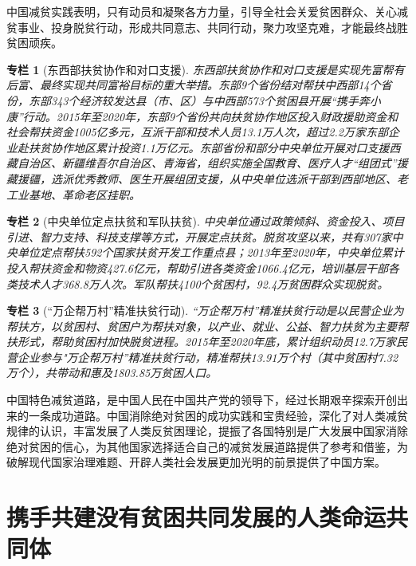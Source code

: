 \documentclass{ctexart}
\newtheorem{zhuanlan}{专栏}
\begin{document}
中国减贫实践表明，只有动员和凝聚各方力量，引导全社会关爱贫困群众、关心减贫事业、投身脱贫行动，形成共同意志、共同行动，聚力攻坚克难，才能最终战胜贫困顽疾。

\begin{zhuanlan}[东西部扶贫协作和对口支援]
    东西部扶贫协作和对口支援是实现先富帮有后富、最终实现共同富裕目标的重大举措。东部9个省份结对帮扶中西部14个省份，东部343个经济较发达县（市、区）与中西部573个贫困县开展“携手奔小康”行动。2015年至2020年，东部9个省份共向扶贫协作地区投入财政援助资金和社会帮扶资金1005亿多元，互派干部和技术人员13.1万人次，超过2.2万家东部企业赴扶贫协作地区累计投资1.1万亿元。东部省份和部分中央单位开展对口支援西藏自治区、新疆维吾尔自治区、青海省，组织实施全国教育、医疗人才“组团式”援藏援疆，选派优秀教师、医生开展组团支援，从中央单位选派干部到西部地区、老工业基地、革命老区挂职。
    \label{col-13}
\end{zhuanlan}

\begin{zhuanlan}[中央单位定点扶贫和军队扶贫]
    中央单位通过政策倾斜、资金投入、项目引进、智力支持、科技支撑等方式，开展定点扶贫。脱贫攻坚以来，共有307家中央单位定点帮扶592个国家扶贫开发工作重点县；2013年至2020年，中央单位累计投入帮扶资金和物资427.6亿元，帮助引进各类资金1066.4亿元，培训基层干部各类技术人才368.8万人次。军队帮扶4100个贫困村，92.4万贫困群众实现脱贫。
    \label{col-14}
\end{zhuanlan}

\begin{zhuanlan}[“万企帮万村”精准扶贫行动]
    “万企帮万村”精准扶贫行动是以民营企业为帮扶方，以贫困村、贫困户为帮扶对象，以产业、就业、公益、智力扶贫为主要帮扶形式，帮助贫困村加快脱贫进程。2015年至2020年底，累计组织动员12.7万家民营企业参与"万企帮万村”精准扶贫行动，精准帮扶13.91万个村（其中贫困村7.32万个），共带动和惠及1803.85万贫困人口。
    \label{col-15}
\end{zhuanlan}

中国特色减贫道路，是中国人民在中国共产党的领导下，经过长期艰辛探索开创出来的一条成功道路。中国消除绝对贫困的成功实践和宝贵经验，深化了对人类减贫规律的认识，丰富发展了人类反贫困理论，提振了各国特别是广大发展中国家消除绝对贫困的信心，为其他国家选择适合自己的减贫发展道路提供了参考和借鉴，为破解现代国家治理难题、开辟人类社会发展更加光明的前景提供了中国方案。

\section{携手共建没有贫困共同发展的人类命运共同体}
\end{document}
